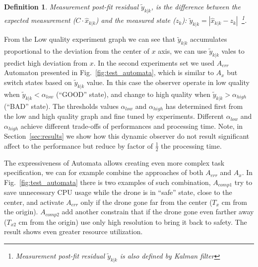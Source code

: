 \documentclass{sig-alternate-ipsn13}
\newtheorem{dfn}[thm]{Definition}
\begin{document}
\begin{dfn}
\textit{Measurement post-fit residual} $\tilde{y}_{k|k}$, is the difference between the expected measurement ($C \cdot \hat{x}_{k|k}$) and the measured state ($z_k$): $\tilde{y}_{k|k} = |  \hat{x}_{k|k} - z_k |$~\footnote{ Measurement post-fit residual $\tilde{y}_{k|k}$ is also defined by Kalman filter}.
\end{dfn}
From the Low quality experiment graph we can see that $\tilde{y}_{k|k}$ accumulates proportional to the deviation from the center of $x$ axis, we can use $\tilde{y}_{k|k}$ vales to predict high deviation from $x$.
In the second experiments set we used $A_{err}$ Automaton presented in Fig.~\ref{fig:test_automata}, which is similar to $A_x$ but switch states based on $\tilde{y}_{k|k}$ value.
In this case the observer operate in low quality when $\tilde{y}_{k|k} < \alpha_{low}$ (``GOOD'' state), and change to high quality when $\tilde{y}_{k|k} > \alpha_{high}$ (``BAD'' state).
The thresholds values $ \alpha_{low}$ and $ \alpha_{high}$ has determined first from the low and high quality graph and fine tuned by experiments. 
Different $ \alpha_{low}$ and $ \alpha_{high}$ achieve different trade-offs of performances and processing time.
Note, in Section~\ref{sec:results} we show how this dynamic observer do not result significant affect to the performance but reduce by factor of $\frac{1}{2}$ the processing time.

The expressiveness of Automata allows creating even more complex task specification, we can for example combine the approaches of both $A_{err}$ and $A_{x}$.
In Fig.~\ref{fig:test_automata} there is two examples of such combination, $A_{comp1}$ try to save unnecessary CPU usage while the drone is in ``safe'' state, close to the center, and activate $A_{err}$ only if the drone gone far from the center ($T_{x}$ cm from the origin).
$A_{comp2}$ add another constrain that if the drone gone even farther away ($T_{x2}$ cm from the origin) use only high resolution to bring it back to safety.
The result shows even greater resource utilization.


\end{document}
